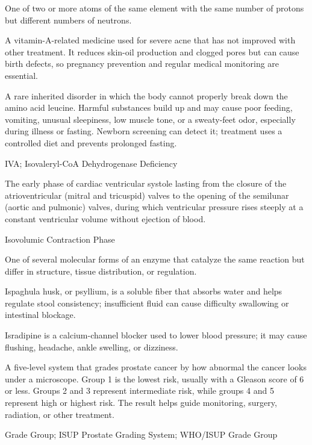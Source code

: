  One of two or more atoms of the same element with the same number of protons but different numbers of neutrons.

 A vitamin-A-related medicine used for severe acne that has not improved with other treatment. It reduces skin-oil production and clogged pores but can cause birth defects, so pregnancy prevention and regular medical monitoring are essential.

 A rare inherited disorder in which the body cannot properly break down the amino acid leucine. Harmful substances build up and may cause poor feeding, vomiting, unusual sleepiness, low muscle tone, or a sweaty-feet odor, especially during illness or fasting. Newborn screening can detect it; treatment uses a controlled diet and prevents prolonged fasting.

\synonyms
IVA; Isovaleryl-CoA Dehydrogenase Deficiency

 The early phase of cardiac ventricular systole lasting from the closure of the atrioventricular (mitral and tricuspid) valves to the opening of the semilunar (aortic and pulmonic) valves, during which ventricular pressure rises steeply at a constant ventricular volume without ejection of blood.

\synonyms
Isovolumic Contraction Phase

 One of several molecular forms of an enzyme that catalyze the same reaction but differ in structure, tissue distribution, or regulation.

 Ispaghula husk, or psyllium, is a soluble fiber that absorbs water and helps regulate stool consistency; insufficient fluid can cause difficulty swallowing or intestinal blockage.

 Isradipine is a calcium-channel blocker used to lower blood pressure; it may cause flushing, headache, ankle swelling, or dizziness.

 A five-level system that grades prostate cancer by how abnormal the cancer looks under a microscope. Group 1 is the lowest risk, usually with a Gleason score of 6 or less. Groups 2 and 3 represent intermediate risk, while groups 4 and 5 represent high or highest risk. The result helps guide monitoring, surgery, radiation, or other treatment.

\synonyms
Grade Group; ISUP Prostate Grading System; WHO/ISUP Grade Group

